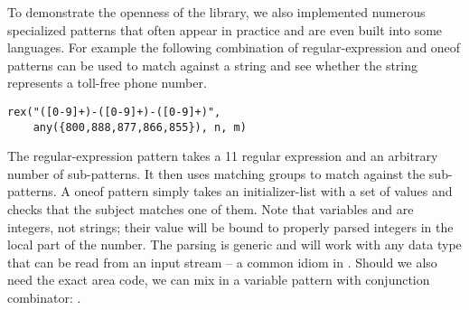 To demonstrate the openness of the library, we also implemented numerous 
specialized patterns that often appear in practice and are even built into some 
languages. For example the following combination of regular-expression and oneof 
patterns can be used to match against a string and see whether the string 
represents a toll-free phone number. 

\begin{lstlisting}
rex("([0-9]+)-([0-9]+)-([0-9]+)", 
    any({800,888,877,866,855}), n, m)
\end{lstlisting}

\noindent
The regular-expression pattern takes a \Cpp{}11 regular expression and an 
arbitrary number of sub-patterns. It then uses matching groups to match against 
the sub-patterns. A oneof pattern simply takes an initializer-list with a set of 
values and checks that the subject matches one of them. Note that variables 
 and  are integers, not strings; their value will be bound to 
properly parsed integers in the local part of the number. The parsing is generic 
and will work with any data type that can be read from an input stream -- a 
common idiom in \Cpp{}. Should we also need the exact area code, we can mix in a 
variable pattern with conjunction combinator: .

